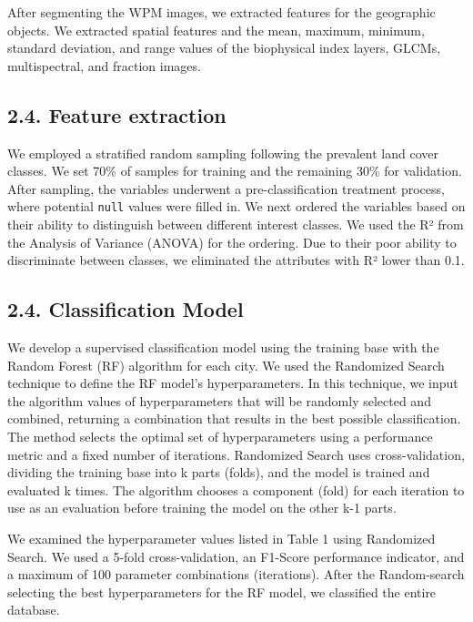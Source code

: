 \documentclass[preprint, 3p,
authoryear]{elsarticle} %
\begin{document}
After segmenting the WPM images, we extracted features for the
geographic objects. We extracted spatial features and the mean, maximum,
minimum, standard deviation, and range values of the biophysical index
layers, GLCMs, multispectral, and fraction images.

\hypertarget{feature-extraction}{%
\subsection{2.4. Feature extraction}\label{feature-extraction}}

We employed a stratified random sampling following the prevalent land
cover classes. We set 70\% of samples for training and the remaining
30\% for validation. After sampling, the variables underwent a
pre-classification treatment process, where potential \texttt{null}
values were filled in. We next ordered the variables based on their
ability to distinguish between different interest classes. We used the
R² from the Analysis of Variance (ANOVA) for the ordering. Due to their
poor ability to discriminate between classes, we eliminated the
attributes with R² lower than 0.1.

\hypertarget{classification-model}{%
\subsection{2.4. Classification Model}\label{classification-model}}

We develop a supervised classification model using the training base
with the Random Forest (RF) algorithm for each city. We used the
Randomized Search technique to define the RF model's hyperparameters. In
this technique, we input the algorithm values of hyperparameters that
will be randomly selected and combined, returning a combination that
results in the best possible classification. The method selects the
optimal set of hyperparameters using a performance metric and a fixed
number of iterations. Randomized Search uses cross-validation, dividing
the training base into k parts (folds), and the model is trained and
evaluated k times. The algorithm chooses a component (fold) for each
iteration to use as an evaluation before training the model on the other
k-1 parts.

We examined the hyperparameter values listed in Table 1 using Randomized
Search. We used a 5-fold cross-validation, an F1-Score performance
indicator, and a maximum of 100 parameter combinations (iterations).
After the Random-search selecting the best hyperparameters for the RF
model, we classified the entire database.
\end{document}
